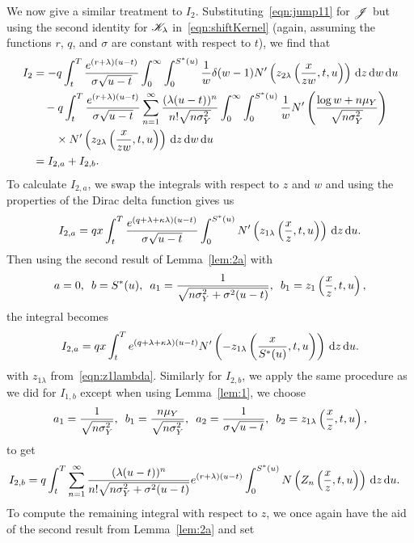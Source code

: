 		We now give a similar treatment to $I_2$. Substituting~\eqref{eqn:jump11} for $\mathscr J$ but using the second identity for $\mathscr K_\lambda$ in~\eqref{eqn:shiftKernel} (again, assuming the functions $r$, $q$, and $\sigma$ are constant with respect to $t$), we find that
		\begin{align*}
        			I_2 &= -q\int_t^T \frac{e^{(r+\lambda)(u-t)}}{\sigma\sqrt{u-t}} \int_0^\infty\int_0^{S^*(u)} \frac{1}{w} \delta(w-1) N'\left( z_{2\lambda}\left( \frac{x}{zw}, t, u \right) \right) \, \mathrm d z \, \mathrm d w \, \mathrm d u \\
        			& {}\quad -q\int_t^T \frac{e^{(r+\lambda)(u-t)}}{\sigma\sqrt{u-t}} \displaystyle\sum\limits_{n=1}^{\infty} \frac{(\lambda(u-t))^n}{n!\sqrt{n\sigma_Y^2}}\int_0^\infty \int_0^{S^*(u)} \frac{1}{w}N'\left( \frac{\log w + n\mu_Y}{\sqrt{n\sigma_Y^2}} \right) \\
        			& {} \quad \quad \times N'\left( z_{2\lambda}\left( \frac{x}{zw}, t, u \right) \right) \, \mathrm d z \, \mathrm d w \, \mathrm d u \\
        			&= I_{2,a} + I_{2,b}.
        		\end{align*}
		To calculate $I_{2,a}$, we swap the integrals with respect to $z$ and $w$ and using the properties of the Dirac delta function gives us
			$$
				I_{2,a} = qx\int_t^T \frac{e^{(q+\lambda+\kappa\lambda)(u-t)}}{\sigma\sqrt{u-t}}\int_0^{S^*(u)} N'\left( z_{1\lambda}\left( \frac{x}{z}, t, u \right) \right) \, \mathrm d z \, \mathrm d u.
			$$
		Then using the second result of Lemma~\ref{lem:2a} with
			$$
				a = 0, \enskip b = S^*(u), \enskip a_1 = \frac{1}{\sqrt{n\sigma_Y^2 + \sigma^2(u-t)}}, \enskip
			b_1 = z_1\left( \frac{x}{z}, t, u \right),
			$$
		the integral becomes
			$$
				I_{2,a} = qx\int_t^T e^{(q+\lambda+\kappa\lambda)(u-t)} N'\left(-z_{1\lambda}\left( \frac{x}{S^*(u)}, t, u \right) \right) \, \mathrm d z \, \mathrm d u.
			$$
		with $z_{1\lambda}$ from~\eqref{eqn:z1lambda}. Similarly for $I_{2,b}$, we apply the same procedure as we did for $I_{1,b}$ except when using Lemma~\ref{lem:1}, we choose
			$$
        			a_1 = \frac{1}{\sqrt{n\sigma_Y^2}}, \enskip b_1 = \frac{n\mu_Y}{\sqrt{n\sigma_Y^2}}, \enskip
        			a_2 = \frac{1}{\sigma\sqrt{u-t}}, \enskip b_2 = z_{1\lambda}\left( \frac{x}{z}, t, u\right),
        		$$
	to get
			\begin{align*}
				I_{2,b} &= q  \int_t^T  \displaystyle\sum\limits_{n=1}^{\infty} \frac{(\lambda(u-t))^n}{n!\sqrt{n\sigma_Y^2 + \sigma^2(u-t)}}  e^{(r+\lambda)(u-t)} \int_0^{S^*(u)} N\left( Z_n \left( \frac{x}{z},t,u  \right) \right) \,\mathrm d z \, \mathrm d u.
			\end{align*}
	To compute the remaining integral with respect to $z$, we once again have the aid of the second result from Lemma~\ref{lem:2a} and set
